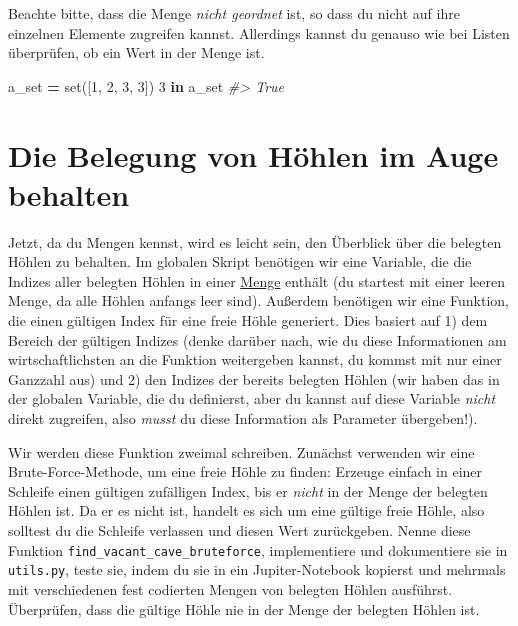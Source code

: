 \documentclass[
]{book}
\newenvironment{Shaded}{\begin{snugshade}}{\end{snugshade}}
\newcommand{\BuiltInTok}[1]{#1}
\newcommand{\CommentTok}[1]{\textcolor[rgb]{0.56,0.35,0.01}{\textit{#1}}}
\newcommand{\DecValTok}[1]{\textcolor[rgb]{0.00,0.00,0.81}{#1}}
\newcommand{\KeywordTok}[1]{\textcolor[rgb]{0.13,0.29,0.53}{\textbf{#1}}}
\newcommand{\NormalTok}[1]{#1}
\newcommand{\OperatorTok}[1]{\textcolor[rgb]{0.81,0.36,0.00}{\textbf{#1}}}
\begin{document}
Beachte bitte, dass die Menge \emph{nicht geordnet} ist, so dass du nicht auf ihre einzelnen Elemente zugreifen kannst. Allerdings kannst du genauso wie bei Listen überprüfen, ob ein Wert in der Menge ist.

\begin{Shaded}
\begin{Highlighting}[]
\NormalTok{a\_set }\OperatorTok{=} \BuiltInTok{set}\NormalTok{([}\DecValTok{1}\NormalTok{, }\DecValTok{2}\NormalTok{, }\DecValTok{3}\NormalTok{, }\DecValTok{3}\NormalTok{])}
\DecValTok{3} \KeywordTok{in}\NormalTok{ a\_set}
\CommentTok{\#\textgreater{} True}
\end{Highlighting}
\end{Shaded}

\hypertarget{die-belegung-von-huxf6hlen-im-auge-behalten}{%
\section{Die Belegung von Höhlen im Auge behalten}\label{die-belegung-von-huxf6hlen-im-auge-behalten}}

Jetzt, da du Mengen kennst, wird es leicht sein, den Überblick über die belegten Höhlen zu behalten. Im globalen Skript benötigen wir eine Variable, die die Indizes aller belegten Höhlen in einer \protect\hyperlink{sets}{Menge} enthält (du startest mit einer leeren Menge, da alle Höhlen anfangs leer sind). Außerdem benötigen wir eine Funktion, die einen gültigen Index für eine freie Höhle generiert. Dies basiert auf 1) dem Bereich der gültigen Indizes (denke darüber nach, wie du diese Informationen am wirtschaftlichsten an die Funktion weitergeben kannst, du kommst mit nur einer Ganzzahl aus) und 2) den Indizes der bereits belegten Höhlen (wir haben das in der globalen Variable, die du definierst, aber du kannst auf diese Variable \emph{nicht} direkt zugreifen, also \emph{musst} du diese Information als Parameter übergeben!).

Wir werden diese Funktion zweimal schreiben. Zunächst verwenden wir eine Brute-Force-Methode, um eine freie Höhle zu finden: Erzeuge einfach in einer Schleife einen gültigen zufälligen Index, bis er \emph{nicht} in der Menge der belegten Höhlen ist. Da er es nicht ist, handelt es sich um eine gültige freie Höhle, also solltest du die Schleife verlassen und diesen Wert zurückgeben. Nenne diese Funktion \texttt{find\_vacant\_cave\_bruteforce}, implementiere und dokumentiere sie in \texttt{utils.py}, teste sie, indem du sie in ein Jupiter-Notebook kopierst und mehrmals mit verschiedenen fest codierten Mengen von belegten Höhlen ausführst. Überprüfen, dass die gültige Höhle nie in der Menge der belegten Höhlen ist.
\end{document}

